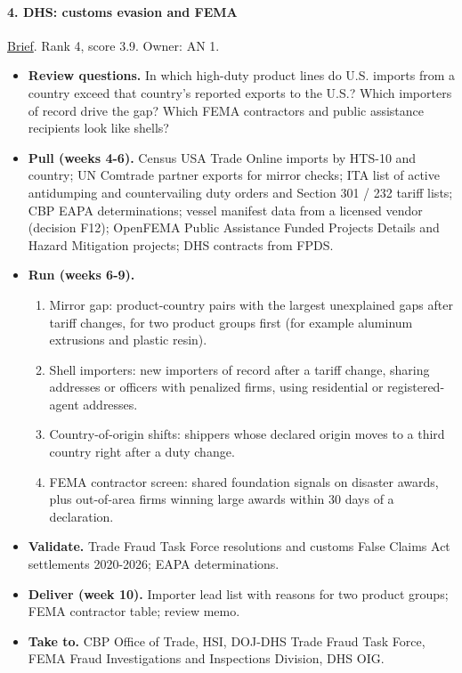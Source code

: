 \documentclass[letterpaper,11pt]{article}
\providecommand{\tightlist}{\setlength{\itemsep}{0pt}\setlength{\parskip}{0pt}}
\begin{document}
\hypertarget{dhs-customs-evasion-and-fema}{%
\paragraph{4. DHS: customs evasion and
FEMA}\label{dhs-customs-evasion-and-fema}}

\href{agencies/dhs.pdf}{Brief}. Rank 4, score 3.9. Owner: AN 1.

\begin{itemize}
\tightlist
\item
  \textbf{Review questions.} In which high-duty product lines do U.S.
  imports from a country exceed that country's reported exports to the
  U.S.? Which importers of record drive the gap? Which FEMA contractors
  and public assistance recipients look like shells?
\item
  \textbf{Pull (weeks 4-6).} Census USA Trade Online imports by HTS-10
  and country; UN Comtrade partner exports for mirror checks; ITA list
  of active antidumping and countervailing duty orders and Section 301 /
  232 tariff lists; CBP EAPA determinations; vessel manifest data from a
  licensed vendor (decision F12); OpenFEMA Public Assistance Funded
  Projects Details and Hazard Mitigation projects; DHS contracts from
  FPDS.
\item
  \textbf{Run (weeks 6-9).}

  \begin{enumerate}
  \def\labelenumi{\arabic{enumi}.}
  \tightlist
  \item
    Mirror gap: product-country pairs with the largest unexplained gaps
    after tariff changes, for two product groups first (for example
    aluminum extrusions and plastic resin).
  \item
    Shell importers: new importers of record after a tariff change,
    sharing addresses or officers with penalized firms, using
    residential or registered-agent addresses.
  \item
    Country-of-origin shifts: shippers whose declared origin moves to a
    third country right after a duty change.
  \item
    FEMA contractor screen: shared foundation signals on disaster
    awards, plus out-of-area firms winning large awards within 30 days
    of a declaration.
  \end{enumerate}
\item
  \textbf{Validate.} Trade Fraud Task Force resolutions and customs
  False Claims Act settlements 2020-2026; EAPA determinations.
\item
  \textbf{Deliver (week 10).} Importer lead list with reasons for two
  product groups; FEMA contractor table; review memo.
\item
  \textbf{Take to.} CBP Office of Trade, HSI, DOJ-DHS Trade Fraud Task
  Force, FEMA Fraud Investigations and Inspections Division, DHS OIG.
\end{itemize}
\end{document}
